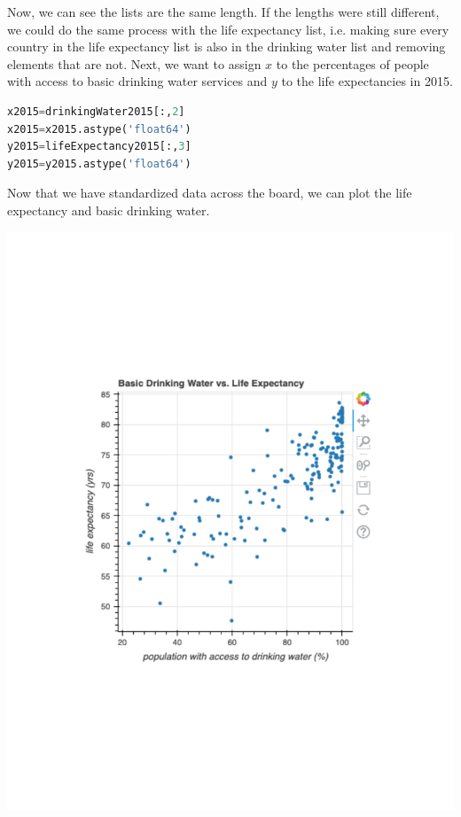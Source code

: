\documentclass[12pt]{article}
\begin{document}
\noindent
Now, we can see the lists are the same length. If the lengths were still different, we could do the same process with the life expectancy list, i.e. making sure every country in the life expectancy list is also in the drinking water list and removing elements that are not. Next, we want to assign $x$ to the percentages of people with access to basic drinking water services and $y$ to the life expectancies in 2015.
\begin{lstlisting}[language=Python]
x2015=drinkingWater2015[:,2]
x2015=x2015.astype('float64')
y2015=lifeExpectancy2015[:,3]
y2015=y2015.astype('float64')
\end{lstlisting}

\noindent
Now that we have standardized data across the board, we can plot the life expectancy and basic drinking water.

\begin{center}
\includegraphics[width=6in]{Manuscript/figure3.pdf}\\
\end{center}
\end{document}
